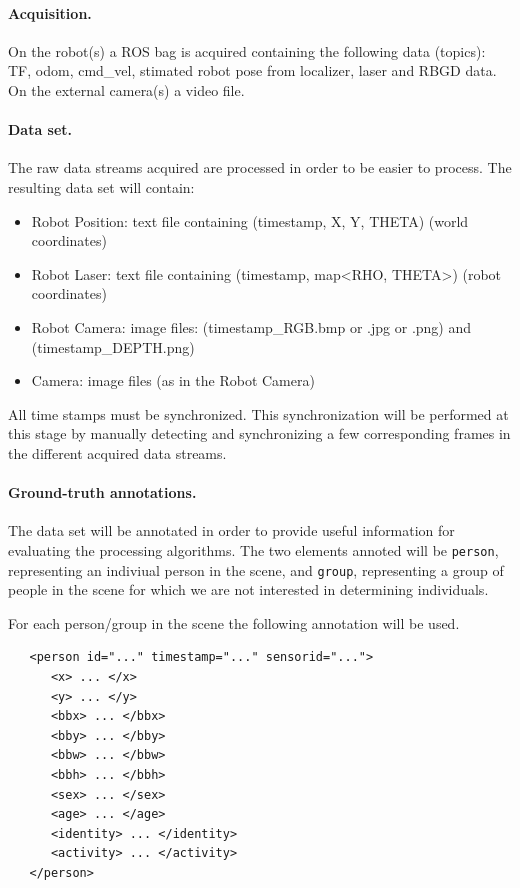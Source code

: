 \documentclass{article}
\begin{document}
\paragraph{Acquisition.} On the robot(s) a ROS bag is acquired containing the following data (topics): 
TF, odom, cmd\_vel, stimated robot pose from localizer, laser and RBGD data. On the external camera(s) a video file. 

\paragraph{Data set.} The raw data streams acquired are processed in order to be easier to process. The resulting data set will contain:
\begin{itemize}
\item Robot Position: text file containing (timestamp, X, Y, THETA) (world coordinates)
\item Robot Laser: text file containing (timestamp, map<RHO, THETA>)  (robot coordinates)
\item Robot Camera: image files:	(timestamp\_RGB.bmp or .jpg or .png) and
 				(timestamp\_DEPTH.png)
\item Camera: image files (as in the Robot Camera)
\end{itemize}

All time stamps must be synchronized. This synchronization will be performed at this stage by manually detecting and synchronizing a few corresponding frames in the different acquired data streams.

\paragraph{Ground-truth annotations.} The data set will be annotated in order to provide useful information for evaluating the processing algorithms.
The two elements annoted will be {\tt person}, representing an indiviual person in the scene, and {\tt group}, representing a group of people in the scene for which we are not interested in determining individuals.

For each person/group in the scene the following annotation will be used.

\begin{verbatim}
   <person id="..." timestamp="..." sensorid="...">
      <x> ... </x>
      <y> ... </y>
      <bbx> ... </bbx>
      <bby> ... </bby>
      <bbw> ... </bbw>
      <bbh> ... </bbh>
      <sex> ... </sex>
      <age> ... </age>
      <identity> ... </identity>
      <activity> ... </activity>
   </person> 
\end{verbatim}
\end{document}
